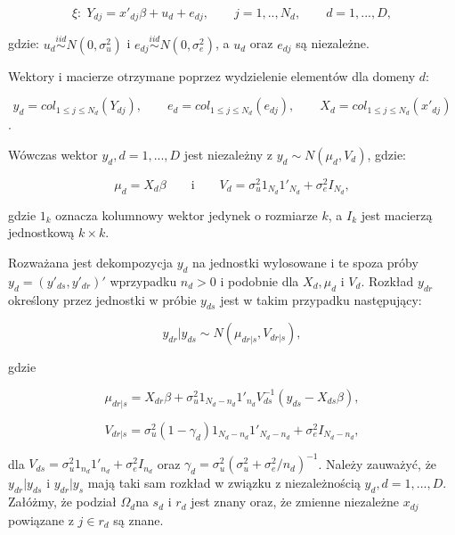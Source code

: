 \begin{equation}
\xi:\;Y_{dj}=x'_{dj}\beta+u_d+e_{dj},\qquad j=1,..,N_d, \qquad d=1,...,D,
\label{eq:modelBHF}
\end{equation}

gdzie: $u_d\stackrel{iid}{\sim}N(0,\sigma^2_u)$ i $e_{dj}\stackrel{iid}{\sim}N(0,\sigma^2_e)$, a $u_d$ oraz $e_{dj}$ są niezależne.

Wektory i macierze otrzymane poprzez wydzielenie elementów dla domeny $d$:

\begin{equation}y_d=col_{1 \leq j \leq N_d}(Y_{dj}),\qquad e_d=col_{1 \leq j \leq N_d}(e_{dj}),\qquad X_d=col_{1 \leq j \leq N_d}(x'_{dj})\end{equation}.

Wówczas wektor $y_d, d=1,...,D$ jest niezależny z $y_d \sim N(\mu_d, V_d)$, gdzie:

\begin{equation}
\mu_d=X_d\beta \qquad \text{i} \qquad V_d=\sigma_u^2 1_{N_d}1'_{N_d}+\sigma_e^2 I_{N_d},
\end{equation}

gdzie $1_k$ oznacza kolumnowy wektor jedynek o rozmiarze $k$, a $I_k$ jest macierzą jednostkową $k \times k$.

Rozważana jest dekompozycja $y_d$ na jednostki wylosowane i te spoza próby $y_d=(y'_{ds},y'_{dr})'$ wprzypadku $n_d>0$ i podobnie dla $X_d, \mu_d$ i $V_d$. Rozkład $y_{dr}$ określony przez jednostki w próbie $y_{ds}$ jest w takim przypadku następujący:

\begin{equation}
y_{dr}|y_{ds} \sim N(\mu_{dr|s}, V_{dr|s}),
\end{equation}

gdzie

\begin{equation}
\mu_{dr|s}=X_{dr}\beta + \sigma^2_u 1_{N_d-n_d}1'_{n_d}V^{-1}_{ds}(y_{ds}-X_{ds}\beta),
\label{eq:mudrs}
\end{equation}

\begin{equation}
V_{dr|s}=\sigma^2_u(1-\gamma_d)1_{N_d-n_d}1'_{N_d-n_d}+\sigma^2_eI_{N_d-n_d},
\label{eq:vdrs}
\end{equation}

dla $V_{ds}=\sigma^2_u1_{n_d}1'_{n_d}+\sigma^2_eI_{n_d}$ oraz $\gamma_d=\sigma^2_u(\sigma^2_u+\sigma^2_e/n_d)^{-1}$. Należy zauważyć, że $y_{dr}|y_{ds}$ i $y_{dr}|y_s$ mają taki sam rozkład w związku z niezależnością $y_d, d=1,...,D$. Załóżmy, że podział $\Omega_d$na $s_d$ i $r_d$ jest znany oraz, że zmienne niezależne $x_{dj}$ powiązane z $j \in r_d$ są znane.


